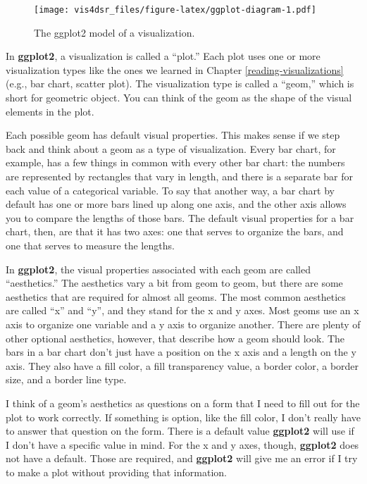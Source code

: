 \documentclass[
]{krantz}
\begin{document}
\begin{figure}
\centering
\texttt{[image: vis4dsr\_files/figure-latex/ggplot-diagram-1.pdf]}
\caption{\label{fig:ggplot-diagram}The ggplot2 model of a visualization.}
\end{figure}

In \textbf{ggplot2},
a visualization is called a ``plot.'' Each plot uses one or more visualization types
like the ones we learned in Chapter \ref{reading-visualizations} (e.g., bar
chart, scatter plot). The visualization type is called a ``geom,'' which is short
for geometric object. You can think of the geom as the shape of the visual elements
in the plot.

Each possible geom has default visual properties. This makes sense if we step back
and think about a geom as a type of visualization. Every bar chart, for example,
has a few things in common with every other bar chart: the numbers are represented
by rectangles that vary in length, and there is a separate bar for each value of
a categorical variable. To say that another way, a bar chart by default has one
or more bars lined up along one axis, and the other axis allows you to compare
the lengths of those bars. The default visual properties for a bar chart, then,
are that it has two axes: one that serves to organize the bars, and one that
serves to measure the lengths.

In \textbf{ggplot2}, the visual properties associated with each geom are called ``aesthetics.''
The aesthetics vary a bit from geom to geom, but there are some aesthetics that
are required for almost all geoms. The most common aesthetics are called ``x'' and ``y'',
and they stand for the x and y axes. Most geoms use an x axis to organize
one variable and a y axis to organize another. There are plenty of other optional
aesthetics, however, that describe how a geom should look. The bars
in a bar chart don't just have a position on the x axis and a length on the y axis.
They also have a fill color, a fill transparency value, a border color, a border
size, and a border line type.

I think of a geom's aesthetics as questions on a form that I need to fill out for the
plot to work correctly. If something is option, like the fill color, I don't really
have to answer that question on the form. There is a default value \textbf{ggplot2} will
use if I don't have a specific value in mind. For the x and y axes, though, \textbf{ggplot2}
does not have a default. Those are required, and \textbf{ggplot2} will give me an error
if I try to make a plot without providing that information.
\end{document}
